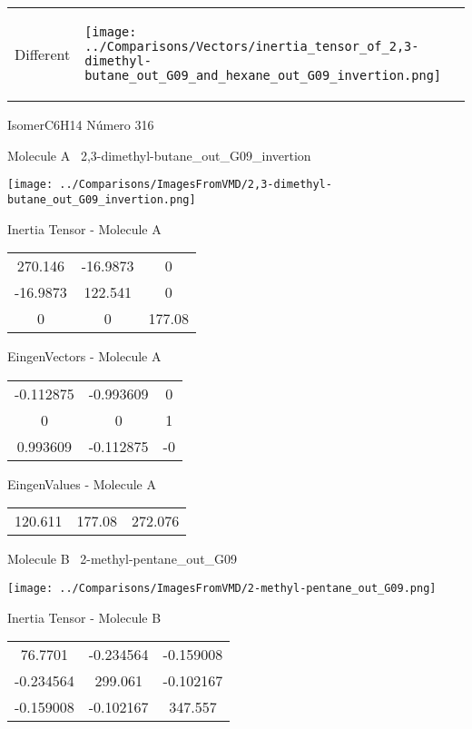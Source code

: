 \vtab[-5mm]
\begin{tabular}{*{2}{m{}}}
\begin{center}
\textcolor{NavyBlue}{\Large Different}
\end{center}
&
\begin{center}
\texttt{[image: ../Comparisons/Vectors/inertia\_tensor\_of\_2,3-dimethyl-butane\_out\_G09\_and\_hexane\_out\_G09\_invertion.png]}
\end{center}
\end{tabular}

 \newpage

\vtab[-3cm]
\begin{center}
{\large IsomerC6H14 \tab Número 316}
\end{center}
\begin{multicols}{2}
\begin{center}

Molecule A \
2,3-dimethyl-butane\_out\_G09\_invertion

\texttt{[image: ../Comparisons/ImagesFromVMD/2,3-dimethyl-butane\_out\_G09\_invertion.png]}

Inertia Tensor - Molecule A \\
\begin{tabular}{|c c c|}
270.146	 & 	-16.9873	 & 	0	 \\
-16.9873	 & 	122.541	 & 	0	 \\
0	 & 	0	 & 	177.08
\end{tabular}

\vtab
 EingenVectors - Molecule A     \\
\begin{tabular}{|c c c|}
-0.112875	 & 	-0.993609	 & 	0	 \\
0	 & 	0	 & 	1	 \\
0.993609	 & 	-0.112875	 & 	-0
\end{tabular}

\vtab
 EingenValues - Molecule A     \\
\begin{tabular}{|c c c|}
120.611	 & 	177.08	 & 	272.076	 \\
\end{tabular}
\columnbreak

Molecule B \
2-methyl-pentane\_out\_G09

\texttt{[image: ../Comparisons/ImagesFromVMD/2-methyl-pentane\_out\_G09.png]}

Inertia Tensor - Molecule B \\
\begin{tabular}{|c c c|}
76.7701	 & 	-0.234564	 & 	-0.159008	 \\
-0.234564	 & 	299.061	 & 	-0.102167	 \\
-0.159008	 & 	-0.102167	 & 	347.557
\end{tabular}


\end{center}
\end{multicols}
